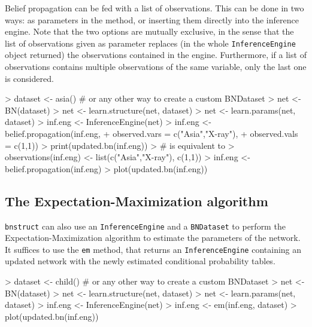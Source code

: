 \documentclass{article}
\newcommand{\Robject}[1]{{\texttt{#1}}}
\newcommand{\Rpackage}[1]{{\texttt{#1}}}
\newcommand{\Rmethod}[1]{{\texttt{#1}}}
\begin{document}
Belief propagation can be fed with a list of observations. This can be done in two ways: as parameters in the method,
or inserting them directly into the inference engine. Note that the two options are mutually exclusive, in the sense that
the list of observations given as parameter replaces (in the whole \Robject{InferenceEngine} object returned)
the observations contained in the engine. Furthermore, if a list of observations contains multiple observations
of the same variable, only the last one is considered.
\begin{Schunk}
\begin{Sinput}
> dataset <- asia() # or any other way to create a custom BNDataset
> net     <- BN(dataset)
> net     <- learn.structure(net, dataset)
> net     <- learn.params(net, dataset)
> inf.eng <- InferenceEngine(net)
> inf.eng <- belief.propagation(inf.eng,
+                               observed.vars = c("Asia","X-ray"),
+                               observed.vals = c(1,1))
> print(updated.bn(inf.eng))
> # is equivalent to
> observations(inf.eng) <- list(c("Asia","X-ray"), c(1,1))
> inf.eng <- belief.propagation(inf.eng)
> plot(updated.bn(inf.eng))
\end{Sinput}
\end{Schunk}

\subsection{The Expectation-Maximization algorithm}
\Rpackage{bnstruct} can also use an \Robject{InferenceEngine} and a \Robject{BNDataset} to perform
the Expectation-Maximization algorithm to estimate the parameters of the network.
It suffices to use the \Rmethod{em} method, that returns an \Robject{InferenceEngine} containing
an updated network with the newly estimated conditional probability tables.
\begin{Schunk}
\begin{Sinput}
> dataset <- child() # or any other way to create a custom BNDataset
> net     <- BN(dataset)
> net     <- learn.structure(net, dataset)
> net     <- learn.params(net, dataset)
> inf.eng <- InferenceEngine(net)
> inf.eng <- em(inf.eng, dataset)
> plot(updated.bn(inf.eng))
\end{Sinput}
\end{Schunk}



\end{document}
